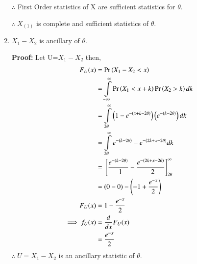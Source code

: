 \documentclass[journal,12pt,twocolumn]{IEEEtran}
\begin{document}
\begin{enumerate}
    $\therefore$ First Order statistics of X are sufficient statistics for $\theta$.
    
    $\therefore\;X_{(1)}$ is complete and sufficient statistics of $\theta$. 
    \item $X_1-X_2$ is ancillary of $\theta$.
    
    \textbf{Proof: }Let U=$X_1-X_2$ then,
    \begin{align}
     \nonumber   F_U(x)&=\Pr\left(X_1-X_2<x\right)\\
    \nonumber
    &=\int\limits_{-\infty}^{\infty}\Pr\left(X_1<x+k\right)\Pr\left(X_2>k\right) dk\\
  \nonumber      &= \int\limits_{2\theta}^{\infty}\left(1-e^{-\left(x+k-2\theta\right)}\right)\left(e^{-\left(k-2\theta\right)}\right) dk\\
 \nonumber &=\int\limits_{2\theta}^{\infty}e^{-\left(k-2\theta\right)}-e^{-\left(2k+x-2\theta\right)} dk\\
\nonumber &= {}\left[\frac{e^{-\left(k-2\theta\right)}}{-1}-\frac{e^{-\left(2k+x-2\theta\right)}}{-2}\right]_{2\theta}^{\infty}\\
  \nonumber  &=(0-0)-\left(-1+\frac{e^{-x}}{2}\right)\\
    F_U(x)&= 1-\frac{e^{-x}}{2}\\
    \implies f_U(x)&=\dfrac{d}{dx}F_U(x)\\
    &=\frac{e^{-x}}{2}
    \end{align}
    $\therefore\;U=X_1-X_2$ is an ancillary statistic of $\theta$.
\end{enumerate}
\end{document}
